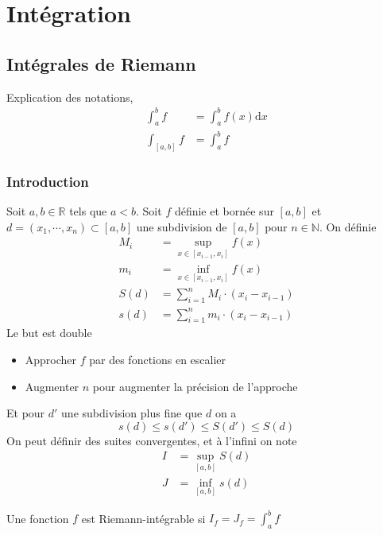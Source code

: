 \documentclass[11pt,colorlinks]{book}
\theoremstyle{mytheoremstyle}
\theoremstyle{mytheoremstyle}
\theoremstyle{mytheoremstyle}
\theoremstyle{mytheoremstyle}
\theoremstyle{mytheoremstyle}
\theoremstyle{mytheoremstyle}
\theoremstyle{mytheoremstyle}
\theoremstyle{mytheoremstyle}
\theoremstyle{myproblemstyle}
\def\mbb#1{\mathbb{#1}}
\def\bN{\mbb{N}}
\def\bR{\mbb{R}}
\begin{document}
  \chapter{Intégration}
  \section{Intégrales de Riemann}
  Explication des notations,
  \begin{align*}
    \int_a^b f &= \int_a^b f(x) \text{d}x \\ 
    \int_{[a,b]} f &= \int_a^b f
  \end{align*}
  \subsection{Introduction}
  Soit $a,b \in \bR$ tels que $a < b$. Soit $f$ définie et bornée sur $[a,b]$ et $d=(x_1,\cdots,x_n) \subset [a,b]$ une subdivision de $[a,b]$ pour $n \in \bN$.  
  On définie 
  \begin{align*}
    M_i &= \sup_{x\in [x_{i-1},x_i]} f(x) \\ 
    m_i &= \inf_{x\in [x_{i-1},x_i]} f(x) \\ 
    S(d) &= \sum_{i=1}^n M_i \cdot (x_i-x_{i-1}) \\ 
    s(d) &= \sum_{i=1}^n m_i \cdot (x_i-x_{i-1})
  \end{align*}
  Le but est double 
  \begin{itemize}
    \item Approcher $f$ par des fonctions en escalier 
    \item Augmenter $n$ pour augmenter la précision de l'approche
  \end{itemize}
  Et pour $d'$ une subdivision plus fine que $d$ on a 
  \begin{equation*}
    s(d) \leq s(d') \leq S(d') \leq S(d)
  \end{equation*}
  On peut définir des suites convergentes, et à l'infini on note 
  \begin{align*}
    I &= \sup_{[a,b]} S(d) \\ 
    J &= \inf_{[a,b]} s(d)
  \end{align*}
  \begin{definition}
    Une fonction $f$ est Riemann-intégrable si $I_f=J_f=\int_{a}^b f$
  \end{definition}
\end{document}
